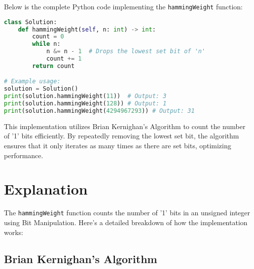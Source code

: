 Below is the complete Python code implementing the \texttt{hammingWeight} function:

\begin{fullwidth}
\begin{lstlisting}[language=Python]
class Solution:
    def hammingWeight(self, n: int) -> int:
        count = 0
        while n:
            n &= n - 1  # Drops the lowest set bit of 'n'
            count += 1
        return count

# Example usage:
solution = Solution()
print(solution.hammingWeight(11))  # Output: 3
print(solution.hammingWeight(128)) # Output: 1
print(solution.hammingWeight(4294967293)) # Output: 31
\end{lstlisting}
\end{fullwidth}

This implementation utilizes Brian Kernighan’s Algorithm to count the number of '1' bits efficiently. By repeatedly removing the lowest set bit, the algorithm ensures that it only iterates as many times as there are set bits, optimizing performance.

\section*{Explanation}

The \texttt{hammingWeight} function counts the number of '1' bits in an unsigned integer using Bit Manipulation. Here's a detailed breakdown of how the implementation works:

\subsection*{Brian Kernighan’s Algorithm}

